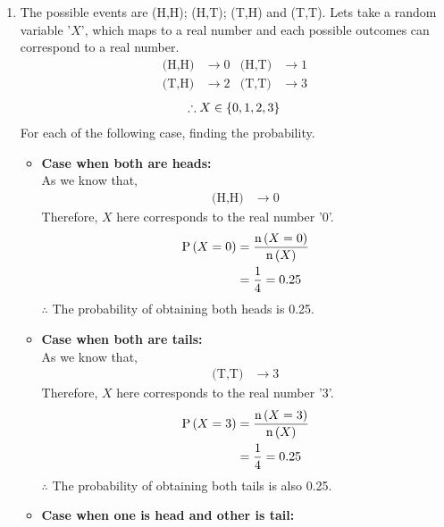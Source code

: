\documentclass[journal,12pt,twocolumn]{IEEEtran}
\begin{document}
    \begin{enumerate}[label=(\roman*)]
    \item The possible events are (H,H); (H,T); (T,H) and (T,T). Lets take a random variable '$X$', which maps to a real number and each possible outcomes can correspond to a real number.
    \begin{align*}
    \text{(H,H)}&\rightarrow 0  &  \text{(H,T)}&\rightarrow 1\\
    \text{(T,H)}&\rightarrow 2  &  \text{(T,T)}&\rightarrow 3
    \end{align*}
    \begin{align*}
    \therefore X \in \left\{0, 1, 2, 3\right\}
    \end{align*}
    For each of the following case, finding the probability.
    \begin{itemize}
    \item \textbf{Case when both are heads:}\\
    As we know that,
    \begin{align*}
    \text{(H,H)}&\rightarrow 0
    \end{align*}
    Therefore, $X$ here corresponds to the real number '$0$'.
    \begin{align}
    \text{P}\left(X = 0\right) &= \frac{\text{n}\left(X = 0\right)}{\text{n}\left(X\right)}\\
                                              &= \frac{1}{4} = 0.25
    \end{align}
    $\therefore$ The probability of obtaining both heads is 0.25.
    \end{itemize}
    \begin{itemize}
    \item \textbf{Case when both are tails:}\\
    As we know that,
    \begin{align*}
    \text{(T,T)}&\rightarrow 3
    \end{align*}
    Therefore, $X$ here corresponds to the real number '$3$'.
    \begin{align}
    \text{P}\left(X = 3\right) &= \frac{\text{n}\left(X = 3\right)}{\text{n}\left(X\right)}\\
                                              &= \frac{1}{4} = 0.25
    \end{align}
    $\therefore$ The probability of obtaining both tails is also 0.25.
    \end{itemize}
    \begin{itemize}
    \item \textbf{Case when one is head and other is tail:}\\

\end{itemize}
\end{enumerate}
\end{document}

